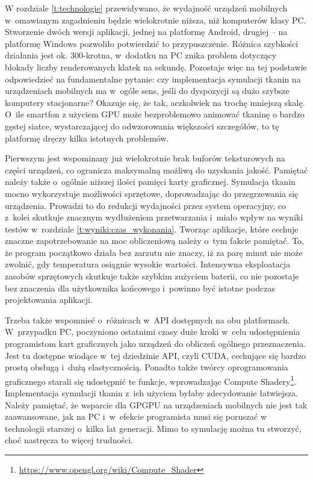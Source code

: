 	
	W rozdziale \ref{t:technologie} przewidywano, że wydajność urządzeń mobilnych w~omawianym zagadnieniu będzie wielokrotnie niższa, niż komputerów klasy PC. Stworzenie dwóch wersji aplikacji, jednej na platformę Android, drugiej -- na platformę Windows pozwoliło potwierdzić to przypuszczenie. Różnica szybkości działania jest ok. 300-krotna, w~dodatku na PC znika problem dotyczący blokady liczby renderowanych klatek na sekundę. Pozostaje więc na tej podstawie odpowiedzieć na fundamentalne pytanie: czy implementacja symulacji tkanin na urządzeniach mobilnych ma w~ogóle sens, jeśli do dyspozycji są dużo szybsze komputery stacjonarne? Okazuje się, że tak, aczkolwiek na trochę mniejszą skalę. O~ile smartfon z użyciem GPU może bezproblemowo animować tkaninę o bardzo gęstej siatce, wystarczającej do odwzorowania większości szczegółów, to tę platformę dręczy kilka istotnych problemów. 
	
	Pierwszym jest wspominany już wielokrotnie brak buforów teksturowych na części urządzeń, co ogranicza maksymalną możliwą do uzyskania jakość. Pamiętać należy także o~ogólnie niższej ilości pamięci karty graficznej. Symulacja tkanin mocno wykorzystuje możliwości sprzętowe, doprowadzając do przegrzewania się urządzenia. Prowadzi to do redukcji wydajności przez system operacyjny, co z~kolei skutkuje znacznym wydłużeniem przetwarzania i~miało wpływ na wyniki testów w~rozdziale \ref{t:wyniki:czas_wykonania}. Tworząc aplikacje, które cechuje znaczne zapotrzebowanie na moc obliczeniową należy o~tym fakcie pamiętać. To, że program początkowo działa bez zarzutu nie znaczy, iż za parę minut nie może zwolnić, gdy temperatura osiągnie wysokie wartości. Intensywna eksploatacja zasobów sprzętowych skutkuje także szybkim zużyciem baterii, co nie pozostaje bez znaczenia dla użytkownika końcowego i~powinno być istotne podczas projektowania aplikacji.
	
	Trzeba także wspomnieć o~różnicach w~API dostępnych na obu platformach. W~przypadku PC, poczyniono ostatnimi czasy duże kroki w~celu udostępnienia programistom kart graficznych jako urządzeń do obliczeń ogólnego przeznaczenia. Jest tu dostępne wiodące w~tej dziedzinie API, czyli CUDA, cechujące się bardzo prostą obsługą i~dużą elastycznością. Ponadto także twórcy oprogramowania graficznego starali się udostępnić te funkcje, wprowadzając Compute Shadery\footnote{\href{https://www.opengl.org/wiki/Compute\_Shader}{https://www.opengl.org/wiki/Compute\_Shader}}. Implementacja symulacji tkanin z~ich użyciem byłaby zdecydowanie łatwiejsza. Należy pamiętać, że wsparcie dla GPGPU na urządzeniach mobilnych nie jest tak zaawansowane, jak na PC i~w~efekcie programista musi się poruszać w technologii starszej o~kilka lat generacji. Mimo to symulację można tu stworzyć, choć nastręcza to więcej trudności.
	
